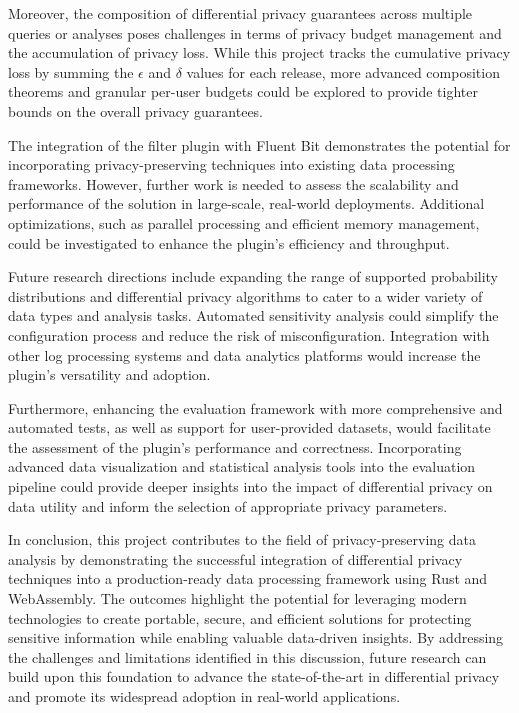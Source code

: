Moreover, the composition of differential privacy guarantees across multiple queries or analyses poses challenges in terms of privacy budget management and the accumulation of privacy loss. While this project tracks the cumulative privacy loss by summing the $\epsilon$ and $\delta$ values for each release, more advanced composition theorems and granular per-user budgets could be explored to provide tighter bounds on the overall privacy guarantees.

The integration of the filter plugin with Fluent Bit demonstrates the potential for incorporating privacy-preserving techniques into existing data processing frameworks. However, further work is needed to assess the scalability and performance of the solution in large-scale, real-world deployments. Additional optimizations, such as parallel processing and efficient memory management, could be investigated to enhance the plugin's efficiency and throughput.

Future research directions include expanding the range of supported probability distributions and differential privacy algorithms to cater to a wider variety of data types and analysis tasks. Automated sensitivity analysis could simplify the configuration process and reduce the risk of misconfiguration. Integration with other log processing systems and data analytics platforms would increase the plugin's versatility and adoption.

Furthermore, enhancing the evaluation framework with more comprehensive and automated tests, as well as support for user-provided datasets, would facilitate the assessment of the plugin's performance and correctness. Incorporating advanced data visualization and statistical analysis tools into the evaluation pipeline could provide deeper insights into the impact of differential privacy on data utility and inform the selection of appropriate privacy parameters.

In conclusion, this project contributes to the field of privacy-preserving data analysis by demonstrating the successful integration of differential privacy techniques into a production-ready data processing framework using Rust and WebAssembly. The outcomes highlight the potential for leveraging modern technologies to create portable, secure, and efficient solutions for protecting sensitive information while enabling valuable data-driven insights. By addressing the challenges and limitations identified in this discussion, future research can build upon this foundation to advance the state-of-the-art in differential privacy and promote its widespread adoption in real-world applications.